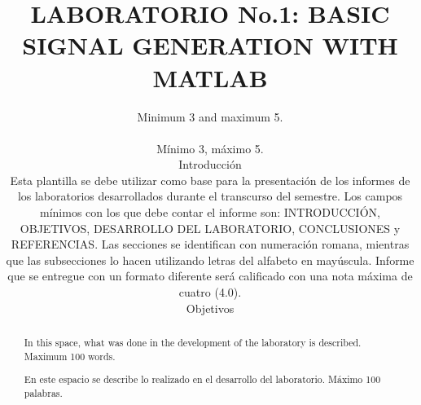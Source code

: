 \documentclass[conference]{IEEEtran}
\begin{document}
\title{LABORATORIO No.1: BASIC SIGNAL GENERATION WITH 
MATLAB
}

\author{

\maketitle

\begin{abstract}
In this space, what was done in the development of the laboratory is described. Maximum 100 words.\\
\end{abstract}
\renewcommand\IEEEkeywordsname{Keywords}
\begin{IEEEkeywords}
Minimum 3 and maximum 5.\\
\end{IEEEkeywords}


\begin{abstract}
En este espacio se describe lo realizado en el desarrollo del laboratorio. Máximo 100 palabras.\\
\end{abstract}

\renewcommand\IEEEkeywordsname{Palabras Clave}
\begin{IEEEkeywords}
Mínimo 3, máximo 5.
\end{IEEEkeywords}


\section{Introducción}
Esta plantilla se debe utilizar como base para la presentación de los informes de los laboratorios desarrollados durante el transcurso del semestre. Los campos mínimos con los que debe contar el informe son: INTRODUCCIÓN, OBJETIVOS, DESARROLLO DEL LABORATORIO, CONCLUSIONES y REFERENCIAS. Las secciones se identifican con numeración romana, mientras que las subsecciones lo hacen utilizando letras del alfabeto en mayúscula. Informe que se entregue con un formato diferente será calificado con una nota máxima de cuatro (4.0). 

\section{Objetivos}

}
\end{document}
